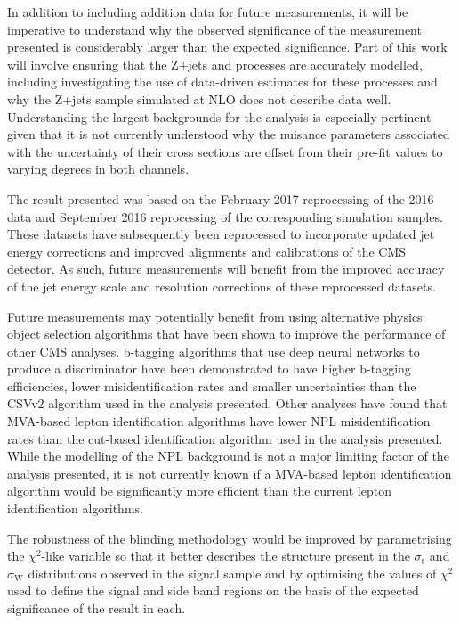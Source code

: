 In addition to including addition data for future measurements, it will be imperative to understand why the observed significance of the measurement presented is considerably larger than the expected significance.
Part of this work will involve ensuring that the Z+jets and \ttbar processes are accurately modelled, including investigating the use of data-driven estimates for these processes and why the Z+jets sample simulated at NLO does not describe data well.
Understanding the largest backgrounds for the analysis is especially pertinent given that it is not currently understood why the nuisance parameters associated with the uncertainty of their cross sections are offset from their pre-fit values to varying degrees in both channels.

The result presented was based on the February 2017 reprocessing of the 2016 data and September 2016 reprocessing of the corresponding simulation samples.
These datasets have subsequently been reprocessed to incorporate updated jet energy corrections and improved alignments and calibrations of the CMS detector.
As such, future measurements will benefit from the improved accuracy of the jet energy scale and resolution corrections of these reprocessed datasets.

Future measurements may potentially benefit from using alternative physics object selection algorithms that have been shown to improve the performance of other CMS analyses.
b-tagging algorithms that use deep neural networks to produce a discriminator have been demonstrated to have higher b-tagging efficiencies, lower misidentification rates and smaller uncertainties than the CSVv2 algorithm used in the analysis presented.
Other analyses have found that MVA-based lepton identification algorithms have lower NPL misidentification rates than the cut-based identification algorithm used in the analysis presented.
While the modelling of the NPL background is not a major limiting factor of the analysis presented, it is not currently known if a MVA-based lepton identification algorithm would be significantly more efficient than the current lepton identification algorithms.

The robustness of the blinding methodology would be improved by parametrising the $\chi^{2}$-like variable so that it better describes the structure present in the $\sigma_{\mathrm{t}}$ and $\sigma_{\mathrm{W}}$ distributions observed in the signal sample and by optimising the values of $\chi^{2}$ used to define the signal and side band regions on the basis of the expected significance of the result in each.

